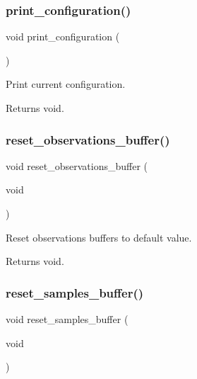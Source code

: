 \subsubsection{\texorpdfstring{print\+\_\+configuration()}{print\_configuration()}}
{\footnotesize\ttfamily void print\+\_\+configuration (\begin{DoxyParamCaption}{ }\end{DoxyParamCaption})}



Print current configuration. 

\begin{DoxyReturn}{Returns}
void. 
\end{DoxyReturn}
\mbox{\label{i2c-th_8h_a49fdbb850fac1a3832e7852a24c31c72}} 
\subsubsection{\texorpdfstring{reset\+\_\+observations\+\_\+buffer()}{reset\_observations\_buffer()}}
{\footnotesize\ttfamily void reset\+\_\+observations\+\_\+buffer (\begin{DoxyParamCaption}\item[{void}]{ }\end{DoxyParamCaption})}



Reset observations buffers to default value. 

\begin{DoxyReturn}{Returns}
void. 
\end{DoxyReturn}
\mbox{\label{i2c-th_8h_a5f6b7d25ff64c2ddaa0fadd3058fcee3}} 
\subsubsection{\texorpdfstring{reset\+\_\+samples\+\_\+buffer()}{reset\_samples\_buffer()}}
{\footnotesize\ttfamily void reset\+\_\+samples\+\_\+buffer (\begin{DoxyParamCaption}\item[{void}]{ }\end{DoxyParamCaption})}




